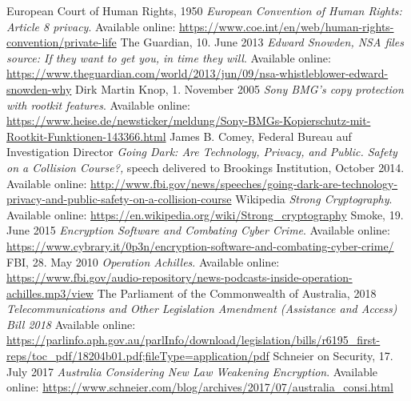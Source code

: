 \documentclass[a4paper, 11pt]{article}
\begin{document}
\clearpage
\begin{thebibliography}{9}
     European Court of Human Rights, 1950 \emph{European Convention of Human Rights: Article 8  privacy}. Available online: \href{https://www.coe.int/en/web/human-rights-convention/private-life}{https://www.coe.int/en/web/human-rights-convention/private-life}
     The Guardian, 10. June 2013 \emph{Edward Snowden, NSA files source: If they want to get you, in time they will}. Available online: \href{https://www.theguardian.com/world/2013/jun/09/nsa-whistleblower-edward-snowden-why}{https://www.theguardian.com/world/2013/jun/09/nsa-whistleblower-edward-snowden-why}
     Dirk Martin Knop, 1. November 2005 \emph{Sony BMG's copy protection with rootkit features}. Available online: \href{https://www.heise.de/newsticker/meldung/Sony-BMGs-Kopierschutz-mit-Rootkit-Funktionen-143366.html}{https://www.heise.de/newsticker/meldung/Sony-BMGs-Kopierschutz-mit-Rootkit-Funktionen-143366.html}
     James B. Comey, Federal Bureau auf Investigation Director \emph{Going Dark: Are Technology, Privacy, and Public. Safety on a Collision Course?,} speech delivered to Brookings Institution, October 2014. Available online: \href{http://www.fbi.gov/news/speeches/going-dark-are-technology-privacy-and-public-safety-on-a-collision-course}{http://www.fbi.gov/news/speeches/going-dark-are-technology-privacy-and-public-safety-on-a-collision-course}
     Wikipedia \emph{Strong Cryptography}. Available online: \href{https://en.wikipedia.org/wiki/Strong\_cryptography}{https://en.wikipedia.org/wiki/Strong\_cryptography}
     Smoke, 19. June 2015 \emph{Encryption Software and Combating Cyber Crime}. Available online: \href{https://www.cybrary.it/0p3n/encryption-software-and-combating-cyber-crime/}{https://www.cybrary.it/0p3n/encryption-software-and-combating-cyber-crime/}
     FBI, 28. May 2010 \emph{Operation Achilles}. Available online: \href{https://www.fbi.gov/audio-repository/news-podcasts-inside-operation-achilles.mp3/view}{https://www.fbi.gov/audio-repository/news-podcasts-inside-operation-achilles.mp3/view}
     The Parliament of the Commonwealth of Australia, 2018 \emph{Telecommunications and Other Legislation Amendment (Assistance and Access) Bill 2018} Available online: \href{https://parlinfo.aph.gov.au/parlInfo/download/legislation/bills/r6195\_first-reps/toc\_pdf/18204b01.pdf;fileType=application/pdf}{https://parlinfo.aph.gov.au/parlInfo/download/legislation/bills/r6195\_first-reps/toc\_pdf/18204b01.pdf;fileType=application/pdf}
     Schneier on Security, 17. July 2017 \emph{Australia Considering New Law Weakening Encryption}. Available online: \href{https://www.schneier.com/blog/archives/2017/07/australia\_consi.html}{https://www.schneier.com/blog/archives/2017/07/australia\_consi.html}
\end{thebibliography}
\end{document}

